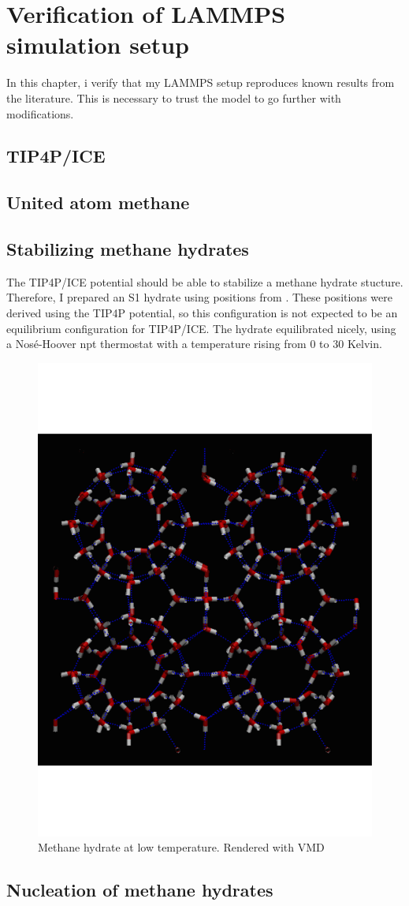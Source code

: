 \chapter{Verification of LAMMPS simulation setup}
In this chapter, i verify that my LAMMPS setup reproduces known results from the literature. This is necessary to trust the model to go further with modifications. 
\section{TIP4P/ICE}
\section{United atom methane}
\section{Stabilizing methane hydrates}
The TIP4P/ICE potential should be able to stabilize a methane hydrate stucture. Therefore, I prepared an S1 hydrate using positions from \cite{Takeuchi2013}. These positions were derived using the TIP4P potential, so this configuration is not expected to be an equilibrium configuration for TIP4P/ICE. The hydrate equilibrated nicely, using a Nosé-Hoover npt thermostat with a temperature rising from 0 to 30 Kelvin. 

\begin{figure}
\includegraphics[width=\textwidth]{../snapshots/first_stable_hydrate.pdf}
\caption{Methane hydrate at low temperature. Rendered with VMD}
\label{fig:part2:first_hydrate}
\end{figure}

\section{Nucleation of methane hydrates}
